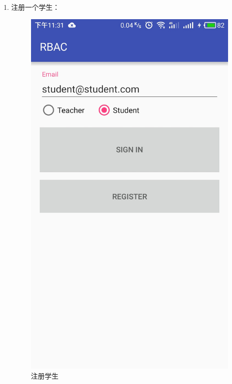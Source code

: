 \begin{itemize}
\begin{enumerate}
\begin{itemize}
\begin{enumerate}
				\item 注册一个学生：
				\begin{figure}[H]
					\centering
					\includegraphics[height=0.39\textheight]{snapshot/8}
					\caption{注册学生}
					\label{fig:8}
				\end{figure}
			

\end{enumerate}
\end{itemize}
\end{enumerate}
\end{itemize}
